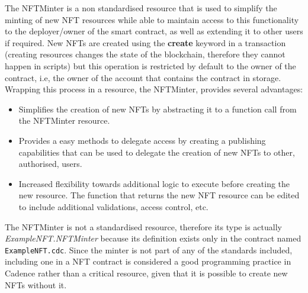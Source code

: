 \documentclass[../main.tex]{subfiles}
\begin{document}
\par
The NFTMinter is a non standardised resource that is used to simplify the minting of new NFT resources while able to maintain access to this functionality to the deployer/owner of the smart contract, as well as extending it to other users if required. New NFTs are created using the \textbf{create} keyword in a transaction (creating resources changes the state of the blockchain, therefore they cannot happen in scripts) but this operation is restricted by default to the owner of the contract, i.e, the owner of the account that contains the contract in storage. Wrapping this process in a resource, the NFTMinter, provides several advantages:

\begin{itemize}
    \item{Simplifies the creation of new NFTs} by abstracting it to a function call from the NFTMinter resource.
    \item {Provides a easy methods to delegate access} by creating a publishing capabilities that can be used to delegate the creation of new NFTs to other, authorised, users.
    \item {Increased flexibility} towards additional logic to execute before creating the new resource. The function that returns the new NFT resource can be edited to include additional validations, access control, etc.
\end{itemize}

The NFTMinter is not a standardised resource, therefore its type is actually \textit{ExampleNFT.NFTMinter} because its definition exists only in the contract named \verb|ExampleNFT.cdc|. Since the minter is not part of any of the standards included, including one in a NFT contract is considered a good programming practice in Cadence rather than a critical resource, given that it is possible to create new NFTs without it.
\end{document}
